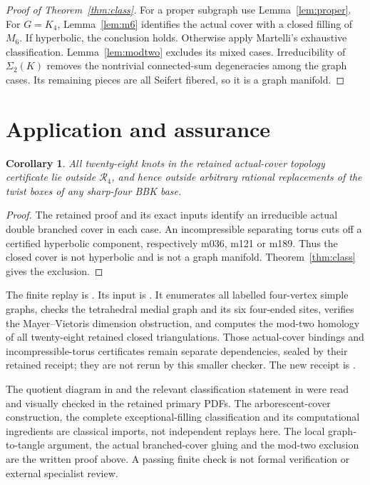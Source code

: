 \documentclass[11pt]{article}
\newtheorem{corollary}[theorem]{Corollary}
\newcommand{\Sig}{\Sigma_2}
\begin{document}
\begin{proof}[Proof of Theorem~\ref{thm:class}]
For a proper subgraph use Lemma~\ref{lem:proper}.
For $G=K_4$, Lemma~\ref{lem:m6} identifies the actual cover with a
closed filling of $M_6$. If hyperbolic, the conclusion holds.
Otherwise apply Martelli's exhaustive classification.
Lemma~\ref{lem:modtwo} excludes its mixed cases.
Irreducibility of $\Sig(K)$ removes the nontrivial connected-sum
degeneracies among the graph cases. Its remaining pieces are all
Seifert fibered, so it is a graph manifold.
\end{proof}

\section{Application and assurance}

\begin{corollary}\label{cor:targets}
All twenty-eight knots in the retained actual-cover topology
certificate lie outside $\mathcal R_4$, and hence outside arbitrary
rational replacements of the twist boxes of any sharp-four BBK base.
\end{corollary}
\begin{proof}
The retained proof  and its exact inputs
identify an irreducible actual double branched cover in each case.
An incompressible separating torus cuts off a certified hyperbolic
component, respectively m036, m121 or m189.
Thus the closed cover is not hyperbolic and is not a graph manifold.
Theorem~\ref{thm:class} gives the exclusion.
\end{proof}

The finite replay is .
Its input is .
It enumerates all labelled four-vertex simple graphs, checks the
tetrahedral medial graph and its six four-ended sites, verifies the
Mayer--Vietoris dimension obstruction, and computes the mod-two
homology of all twenty-eight retained closed triangulations.
Those actual-cover bindings and incompressible-torus certificates
remain separate dependencies, sealed by their retained receipt;
they are not rerun by this smaller checker.
The new receipt is .

The quotient diagram in \cite{km} and the relevant classification
statement in \cite{mar} were read and visually checked in the
retained primary PDFs. The arborescent-cover construction, the complete
exceptional-filling classification and its computational ingredients
are classical imports, not independent replays here.
The local graph-to-tangle argument, the actual branched-cover gluing
and the mod-two exclusion are the written proof above.
A passing finite check is not formal verification or external
specialist review.
\end{document}
